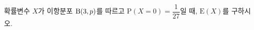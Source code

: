 확률변수 $X$가 이항분포 $\mathrm{B}(3{,}\mkern3mu\mathopen{}p)$를 따르고 $\mathrm{P}(X=0)=\dfrac{1}{27}$일 때, $\mathrm{E}(X)$를 구하시오.
